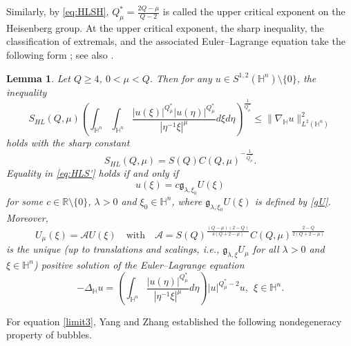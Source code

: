 \documentclass[10pt,a4paper]{amsart}
\newtheorem{lemma}{Lemma}[section]
\begin{document}
Similarly, by \eqref{eq:HLSH}, $Q^{\ast}_{\mu}=\frac{2Q-\mu}{Q-2}$ is called the upper critical exponent on the Heisenberg group.
{At the upper critical exponent, the sharp inequality, the classification of extremals, and the associated Euler--Lagrange equation take the following form \cite{YZ251}; see also \cite{ZWZLX25}.}
\begin{lemma}
 Let $Q\geq 4$, $0<\mu<Q$. Then for any $u\in S^{1,2}(\mathbb{H}^{n})\setminus\{0\}$, the inequality
 \begin{equation}\label{eq:HLS'}
 S_{HL}(Q,\mu) \left(\int_{\mathbb{H}^{n}}\int_{\mathbb{H}^{n}}\frac{|u(\xi)|^{Q^{\ast}_{\mu}}|u(\eta)|
^{Q^{\ast}_{\mu}}}{|\eta^{-1}\xi|^{\mu}}{d}\xi{d}\eta\right)^{\frac{1}{Q^{\ast}_{\mu}}}\leq \|\nabla_{\mathbb{H}}u\|^2_{L^2(\mathbb{H}^{n})}
 \end{equation}
holds with the sharp constant
\begin{equation}\label{relation}
 S_{HL}(Q,\mu)=S(Q)C(Q,\mu)^{-\frac{1}{Q^{\ast}_{\mu}}}.
\end{equation}
Equality in \eqref{eq:HLS'} holds
if and only if \[u(\xi)=c\mathfrak{g}_{\lambda,\xi_0}U(\xi)\] for some $c\in\mathbb{R}\setminus\{0\}$, $\lambda>0$ and $\xi_0\in \mathbb{H}^n$, where $\mathfrak{g}_{\lambda,\xi_0}U(\xi)$ is defined by \eqref{gU}. Moreover,
 \begin{equation*}
 U_\mu(\xi)=\mathcal{A}U(\xi)\quad \mathrm{with}\quad \mathcal{A}=S(Q)^{\frac{(Q-\mu)(2-Q)}{4(Q+2-\mu)}}C(Q,\mu)^{\frac{2-Q}{2(Q+2-\mu)}}
\end{equation*}
is the unique (up to translations and scalings, i.e., $\mathfrak{g}_{\lambda,\xi}U_\mu$ for all $\lambda>0$ and $\xi\in\mathbb{H}^{n}$)
 positive solution of the Euler--Lagrange equation
\begin{equation}\label{limit3}
 -\Delta_{\mathbb{H}} u=\left(\int_{\mathbb{H}^{n}}\frac{|u(\eta)|
^{Q^{\ast}_{\mu}}}{|\eta^{-1}\xi|^{\mu}}{d}\eta\right)|u|^{Q^{\ast}_{\mu}-2}u,~~\xi\in\mathbb{H}^{n}.
\end{equation}
\end{lemma}
For equation \eqref{limit3}, Yang and Zhang \cite{YZ251} established
the following nondegeneracy property of bubbles.
\end{document}
